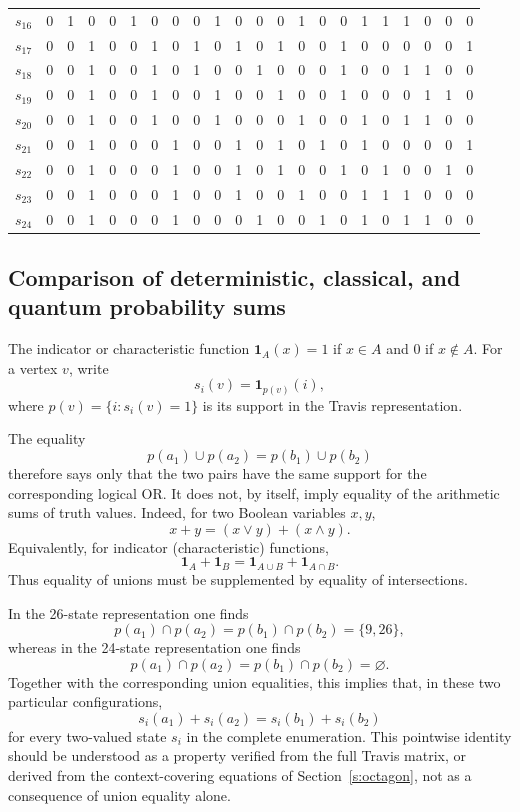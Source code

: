 \documentclass[
  twocolumn,
  aps,
  pra,
  floatfix,
  amsmath,amssymb,
  longbibliography
]{revtex4-2}
\theoremstyle{definition}
\theoremstyle{remark}
\begin{document}
\begin{table}[htb]
\begin{tabular}{l|ccccccccccccccccccccc}
$s_{16}$ & 0&1&0&0&1&0&0&0&1&0&0&0&1&0&0&1&1&1&0&0&0 \\
$s_{17}$ & 0&0&1&0&0&1&0&1&0&1&0&1&0&0&1&0&0&0&0&0&1 \\
$s_{18}$ & 0&0&1&0&0&1&0&1&0&0&1&0&0&0&1&0&0&1&1&0&0 \\
$s_{19}$ & 0&0&1&0&0&1&0&0&1&0&0&1&0&0&1&0&0&0&1&1&0 \\
$s_{20}$ & 0&0&1&0&0&1&0&0&1&0&0&0&1&0&0&1&0&1&1&0&0 \\
$s_{21}$ & 0&0&1&0&0&0&1&0&0&1&0&1&0&1&0&1&0&0&0&0&1 \\
$s_{22}$ & 0&0&1&0&0&0&1&0&0&1&0&1&0&0&1&0&1&0&0&1&0 \\
$s_{23}$ & 0&0&1&0&0&0&1&0&0&1&0&0&1&0&0&1&1&1&0&0&0 \\
$s_{24}$ & 0&0&1&0&0&0&1&0&0&0&1&0&0&1&0&1&0&1&1&0&0 \\
\bottomrule
\end{tabular}
\end{table}

\subsection{Comparison of deterministic, classical, and quantum probability sums}
\label{app:classical_quantum_comparison}

The indicator or characteristic function
\(\mathbf 1_A(x)=1\) if \(x \in A\) and \(0\) if \(x \not\in A\).
For a vertex \(v\), write
\[
s_i(v)=\mathbf 1_{p(v)}(i),
\]
where \(p(v)=\{i:s_i(v)=1\}\) is its support in the Travis representation.

The equality
\[
p(a_1)\cup p(a_2)=p(b_1)\cup p(b_2)
\]
therefore says only that the two pairs have the same support for the
corresponding logical OR. It does not, by itself, imply equality of the
arithmetic sums of truth values. Indeed, for two Boolean variables \(x,y\),
\[
x+y=(x\vee y)+(x\wedge y).
\]
Equivalently, for indicator (characteristic) functions,
\[
\mathbf 1_A+\mathbf 1_B
=
\mathbf 1_{A\cup B}+\mathbf 1_{A\cap B}.
\]
Thus equality of unions must be supplemented by equality of intersections.

In the 26-state representation one finds
\[
p(a_1)\cap p(a_2)=p(b_1)\cap p(b_2)=\{9,26\},
\]
whereas in the 24-state representation one finds
\[
p(a_1)\cap p(a_2)=p(b_1)\cap p(b_2)=\varnothing.
\]
Together with the corresponding union equalities, this implies that, in
these two particular configurations,
\[
s_i(a_1)+s_i(a_2)=s_i(b_1)+s_i(b_2)
\]
for every two-valued state \(s_i\) in the complete enumeration. This
pointwise identity should be understood as a property verified from the
full Travis matrix, or derived from the context-covering equations of
Section~\ref{s:octagon}, not as a consequence of union equality alone.
\end{document}
